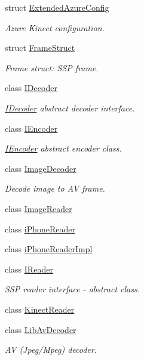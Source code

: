 \begin{DoxyCompactItemize}
struct \hyperlink{structmoetsi_1_1ssp_1_1ExtendedAzureConfig}{Extended\+Azure\+Config}
\begin{DoxyCompactList}\small\item\em Azure Kinect configuration. \end{DoxyCompactList}\item 
struct \hyperlink{structmoetsi_1_1ssp_1_1FrameStruct}{Frame\+Struct}
\begin{DoxyCompactList}\small\item\em Frame struct\+: S\+SP frame. \end{DoxyCompactList}\item 
class \hyperlink{classmoetsi_1_1ssp_1_1IDecoder}{I\+Decoder}
\begin{DoxyCompactList}\small\item\em \hyperlink{classmoetsi_1_1ssp_1_1IDecoder}{I\+Decoder} abstract decoder interface. \end{DoxyCompactList}\item 
class \hyperlink{classmoetsi_1_1ssp_1_1IEncoder}{I\+Encoder}
\begin{DoxyCompactList}\small\item\em \hyperlink{classmoetsi_1_1ssp_1_1IEncoder}{I\+Encoder} abstract encoder class. \end{DoxyCompactList}\item 
class \hyperlink{classmoetsi_1_1ssp_1_1ImageDecoder}{Image\+Decoder}
\begin{DoxyCompactList}\small\item\em Decode image to AV frame. \end{DoxyCompactList}\item 
class \hyperlink{classmoetsi_1_1ssp_1_1ImageReader}{Image\+Reader}
\item 
class \hyperlink{classmoetsi_1_1ssp_1_1iPhoneReader}{i\+Phone\+Reader}
\item 
class \hyperlink{classmoetsi_1_1ssp_1_1iPhoneReaderImpl}{i\+Phone\+Reader\+Impl}
\item 
class \hyperlink{classmoetsi_1_1ssp_1_1IReader}{I\+Reader}
\begin{DoxyCompactList}\small\item\em S\+SP reader interface -\/ abstract class. \end{DoxyCompactList}\item 
class \hyperlink{classmoetsi_1_1ssp_1_1KinectReader}{Kinect\+Reader}
\item 
class \hyperlink{classmoetsi_1_1ssp_1_1LibAvDecoder}{Lib\+Av\+Decoder}
\begin{DoxyCompactList}\small\item\em AV (Jpeg/\+Mpeg) decoder. \end{DoxyCompactList}\item 

\end{DoxyCompactItemize}

